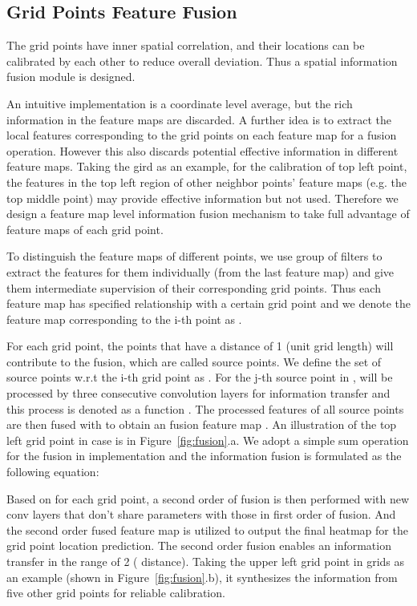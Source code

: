 \documentclass[10pt,twocolumn,letterpaper]{article}
\begin{document}
\subsection{Grid Points Feature Fusion}
The grid points have inner spatial correlation, and their locations can be calibrated by each other to reduce overall deviation. Thus a spatial information fusion module is designed.

An intuitive implementation is a coordinate level average, but the rich information in the feature maps are discarded. 
A further idea is to extract the local features corresponding to the grid points on each feature map for a fusion operation. However this also discards potential effective information in different feature maps. Taking the  gird as an example, for the calibration of top left point, the features in the top left region of other neighbor points' feature maps (e.g. the top middle point) may provide effective information but not used.
Therefore we design a feature map level information fusion mechanism to take full advantage of feature maps of each grid point. 

To distinguish the feature maps of different points, we use  group of filters to extract the features for them individually (from the last feature map) and give them intermediate supervision of their corresponding grid points. Thus each feature map has specified relationship with a certain grid point and we denote the feature map corresponding to the i-th point as .

For each grid point, the points that have a  distance of 1 (unit grid length) will contribute to the fusion, which are called source points. We define the set of source points w.r.t the i-th grid point as . For the j-th source point in ,  will be processed by three consecutive  convolution layers for information transfer and this process is denoted as a function . The processed features of all source points are then fused with  to obtain an fusion feature map . An illustration of the top left grid point in  case is in Figure~\ref{fig:fusion}.a. We adopt a simple sum operation for the fusion in implementation and the information fusion is formulated as the following equation:


Based on  for each grid point, a second order of fusion is then performed with new conv layers  that don't share parameters with those in first order of fusion. And the second order fused feature map  is utilized to output the final heatmap for the grid point location prediction. The second order fusion enables an information transfer in the range of 2 ( distance). Taking the upper left grid point in  grids as an example (shown in Figure~\ref{fig:fusion}.b), it synthesizes the information from five other grid points for reliable calibration.
\end{document}
